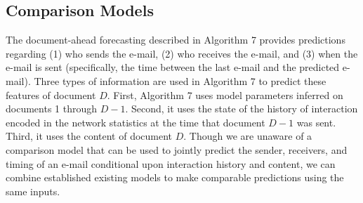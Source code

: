 \documentclass[a4paper]{article}
\begin{document}
\subsection{Comparison Models}

The document-ahead forecasting described in Algorithm 7 provides predictions regarding (1) who sends the e-mail, (2) who receives the e-mail, and (3) when the e-mail is sent (specifically, the time between the last e-mail and the predicted e-mail). Three types of information are used in Algorithm 7 to predict these features of document $D$. First, Algorithm 7 uses model parameters inferred on documents 1 through $D-1$. Second, it uses the state of the history of interaction encoded in the network statistics at the time that document $D-1$ was sent. Third, it uses the content of document $D$. Though we are unaware of a comparison model that can be used to jointly predict the sender, receivers, and timing of an e-mail conditional upon interaction history and content, we can combine established existing models to make comparable predictions using the same inputs. 
\end{document}
